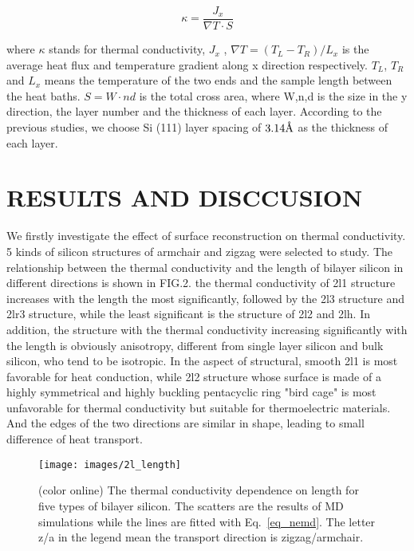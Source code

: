 \documentclass[%
 reprint,
 amsmath,amssymb,
 aps,
 prb,
]{revtex4-1}
\newcommand{\angstrom}{\mbox{\normalfont\AA}}
\begin{document}
\begin{equation}
\kappa = \frac{ J_x}{ \nabla T \cdot S} \label{eq_nemd}
\end{equation}

where $\kappa$ stands for thermal conductivity, $J_x$ , $\nabla T=(T_L-T_R)/L_x$ is the average heat flux and temperature gradient along x direction respectively. $T_L$, $T_R$ and $L_x$ means the temperature of the two ends and the sample length between the heat baths. $S=W \cdot nd$ is the total cross area, where W,n,d is the size in the y direction, the layer number and the thickness of each layer. According to the previous studies, we choose Si (111) layer spacing of $3.14 \angstrom$ as the thickness of each layer.



\section{RESULTS AND DISCCUSION}

We firstly investigate the effect of surface reconstruction on thermal conductivity. 5 kinds of silicon structures of armchair and zigzag were selected to study. The relationship between the thermal conductivity and the length of bilayer silicon in different directions is shown in FIG.2. the thermal conductivity of 2l1 structure increases with the length the most significantly, followed by the 2l3 structure and 2lr3 structure, while the least significant is the structure of 2l2 and 2lh. In addition, the structure with the thermal conductivity increasing significantly with the length is obviously anisotropy, different from single layer silicon and bulk silicon, who tend to be isotropic. In the aspect of structural, smooth 2l1 is most favorable for heat conduction, while 2l2 structure whose surface is made of a highly symmetrical and highly buckling pentacyclic ring "bird cage" is most unfavorable for thermal conductivity but suitable for thermoelectric materials. And the edges of the two directions are similar in shape, leading to small difference of heat transport.

\begin{figure}[b]
\texttt{[image: images/2l\_length]}
\caption{\label{fig:2l_length} (color online) The thermal conductivity dependence on length for five types of bilayer silicon. The scatters are the results of MD simulations while the lines are fitted with Eq.~\ref{eq_nemd}. The letter z/a in the legend mean the transport direction is zigzag/armchair.}
\end{figure}
\end{document}
